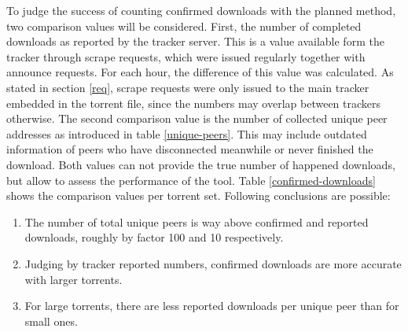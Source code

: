\documentclass[10pt, a4paper, twoside=false, headsepline]{scrbook}
\renewcommand{\_}{\origunderscore\allowbreak}
\begin{document}
To judge the success of counting confirmed downloads with the planned method, two comparison values will be considered. First, the number of completed downloads as reported by the tracker server. This is a value available form the tracker through scrape requests, which were issued regularly together with announce requests. For each hour, the difference of this value was calculated. As stated in section \ref{req}, scrape requests were only issued to the main tracker embedded in the torrent file, since the numbers may overlap between trackers otherwise. The second comparison value is the number of collected unique peer addresses as introduced in table \ref{unique-peers}. This may include outdated information of peers who have disconnected meanwhile or never finished the download. Both values can not provide the true number of happened downloads, but allow to assess the performance of the tool. Table \ref{confirmed-downloads} shows the comparison values per torrent set. Following conclusions are possible:
\begin{enumerate}
\item The number of total unique peers is way above confirmed and reported downloads, roughly by factor 100 and 10 respectively.
\item Judging by tracker reported numbers, confirmed downloads are more accurate with larger torrents.
\item For large torrents, there are less reported downloads per unique peer than for small ones.
\end{enumerate}
\end{document}
